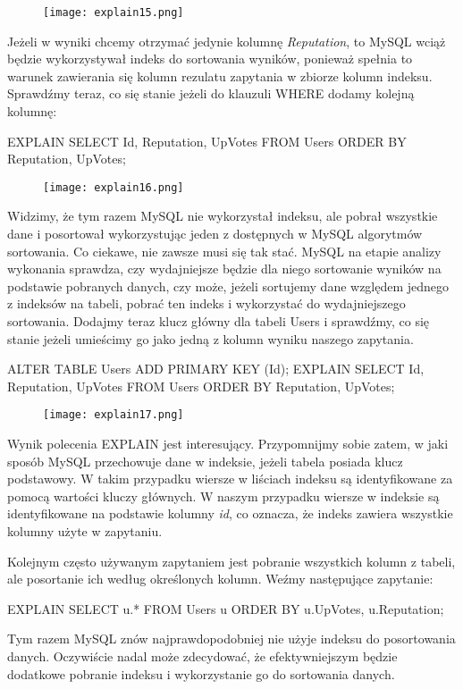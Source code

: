 \begin{figure}[H]
	\texttt{[image: explain15.png]} 
\end{figure}
Jeżeli w wyniki chcemy otrzymać jedynie kolumnę \textit{Reputation}, to MySQL wciąż będzie wykorzystywał indeks do sortowania wyników, ponieważ spełnia to warunek zawierania się kolumn rezulatu zapytania w zbiorze kolumn indeksu. Sprawdźmy teraz, co się stanie jeżeli do klauzuli WHERE dodamy kolejną kolumnę:
\begin{spverbatim}
	EXPLAIN SELECT Id, Reputation, UpVotes FROM Users ORDER BY Reputation, UpVotes;
\end{spverbatim}
\begin{figure}[H]
	\texttt{[image: explain16.png]} 
\end{figure}
Widzimy, że tym razem MySQL nie wykorzystał indeksu, ale pobrał wszystkie dane i posortował wykorzystując jeden z dostępnych w MySQL algorytmów sortowania. Co ciekawe, nie zawsze musi się tak stać. MySQL na etapie analizy wykonania sprawdza, czy wydajniejsze będzie dla niego sortowanie wyników na podstawie pobranych danych, czy może, jeżeli sortujemy dane względem jednego z indeksów na tabeli, pobrać ten indeks i wykorzystać do wydajniejszego sortowania. Dodajmy teraz klucz główny dla tabeli Users i sprawdźmy, co się stanie jeżeli umieścimy go jako jedną z kolumn wyniku naszego zapytania.
\begin{spverbatim}
	ALTER TABLE Users ADD PRIMARY KEY (Id);
	EXPLAIN SELECT Id, Reputation, UpVotes FROM Users ORDER BY Reputation, UpVotes;
\end{spverbatim}

\begin{figure}[H]
	\texttt{[image: explain17.png]} 
\end{figure}
Wynik polecenia EXPLAIN jest interesujący. Przypomnijmy sobie zatem, w jaki sposób MySQL przechowuje dane w indeksie, jeżeli tabela posiada klucz podstawowy. W takim przypadku wiersze w liściach indeksu są identyfikowane za pomocą wartości kluczy głównych. W naszym przypadku wiersze w indeksie są identyfikowane na podstawie kolumny \textit{id}, co oznacza, że indeks zawiera wszystkie kolumny użyte w zapytaniu.

 Kolejnym często używanym zapytaniem jest pobranie wszystkich kolumn z tabeli, ale posortanie ich według określonych kolumn. Weźmy następujące zapytanie:
\begin{spverbatim}
	EXPLAIN SELECT u.* FROM Users u ORDER BY u.UpVotes, u.Reputation;
\end{spverbatim}
Tym razem MySQL znów najprawdopodobniej nie użyje indeksu do posortowania danych. Oczywiście nadal może zdecydować, że efektywniejszym będzie dodatkowe pobranie indeksu i wykorzystanie go do sortowania danych.

